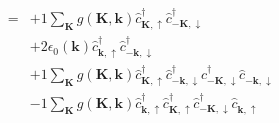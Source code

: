\begin{align*}
	[H, c_{k \uparrow}^\dagger c_{-k \downarrow}^\dagger ] = 	&+1 \sum_{ \mathbf{K} } g( \mathbf{K}, \mathbf{k} )   \hat{c}_{ \mathbf{K}, \uparrow }^\dagger  \hat{c}_{ -\mathbf{K}, \downarrow }^\dagger   \\
	&+2 \epsilon_0( \mathbf{k} )   \hat{c}_{ \mathbf{k}, \uparrow }^\dagger  \hat{c}_{ -\mathbf{k}, \downarrow }^\dagger   \\
	&+1 \sum_{ \mathbf{K} } g( \mathbf{K}, \mathbf{k} )   \hat{c}_{ \mathbf{K}, \uparrow }^\dagger  \hat{c}_{ -\mathbf{k}, \downarrow }^\dagger  \hat{c}_{ -\mathbf{K}, \downarrow }^\dagger  \hat{c}_{ -\mathbf{k}, \downarrow }^{\phantom{\dagger}}  \\
	&-1 \sum_{ \mathbf{K} } g( \mathbf{K}, \mathbf{k} )   \hat{c}_{ \mathbf{k}, \uparrow }^\dagger  \hat{c}_{ \mathbf{K}, \uparrow }^\dagger  \hat{c}_{ -\mathbf{K}, \downarrow }^\dagger  \hat{c}_{ \mathbf{k}, \uparrow }^{\phantom{\dagger}} 
\end{align*}
